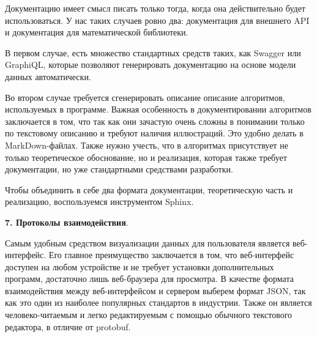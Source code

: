 Документацию имеет смысл писать только тогда, когда она действительно будет использоваться.
У нас таких случаев ровно два: документация для внешнего API и документация для математической библиотеки.

В первом случае, есть множество стандартных средств таких, как Swagger или GraphiQL,
которые позволяют генерировать документацию на основе модели данных автоматически.

Во втором случае требуется сгенерировать описание описание алгоритмов, используемых в программе.
Важная особенность в документировании алгоритмов заключается в том, что так как они зачастую очень сложны
в понимании только по текстовому описанию и требуют наличия иллюстраций. Это удобно делать в MarkDown-файлах.
Также нужно учесть, что в алгоритмах присутствует не только теоретическое обоснование, но и реализация, которая также
требует документации, но уже стандартными средствами разработки.

Чтобы объединить в себе два формата документации, теоретическую часть и реализацию, воспользуемся инструментом Sphinx.

\noindent \textbf{7. Протоколы взаимодействия}.

Самым удобным средством визуализации данных для пользователя является веб-интерфейс.
Его главное преимущество заключается в том, что веб-интерфейс доступен на любом устройстве и не требует установки
дополнительных программ, достаточно лишь веб-браузера для просмотра. В качестве формата взаимодействия между
веб-интерфейсом и сервером выберем формат JSON, так как это один из наиболее популярных стандартов в индустрии.
Также он является человеко-читаемым и легко редактируемым с помощью обычного текстового редактора, в отличие от
protobuf.

